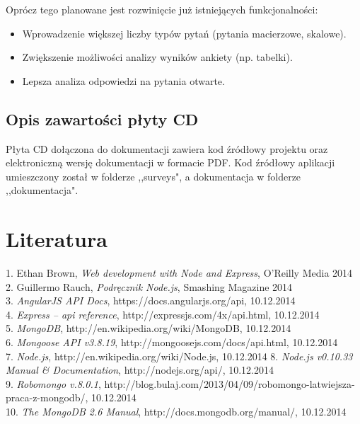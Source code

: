 \documentclass[12pt,a4paper,notitlepage]{article}
\begin{document}
Oprócz tego planowane jest rozwinięcie już istniejących funkcjonalności:
\begin{itemize}
\item Wprowadzenie większej liczby typów pytań (pytania macierzowe, skalowe).
\item Zwiększenie możliwości analizy wyników ankiety (np. tabelki).
\item Lepsza analiza odpowiedzi na pytania otwarte.
\end{itemize}

\subsection{Opis zawartości płyty CD}
Płyta CD dołączona do dokumentacji zawiera kod źródłowy projektu oraz elektroniczną wersję dokumentacji w formacie PDF. Kod źródłowy aplikacji umieszczony został w folderze ,,surveys", a dokumentacja w folderze ,,dokumentacja".

\newpage
\section*{Literatura}

%
1. Ethan Brown, \textit{Web development with Node and Express}, O’Reilly Media 2014 \\
2. Guillermo Rauch, \textit{Podręcznik Node.js}, Smashing Magazine 2014 \\
3. \textit{AngularJS API Docs}, https://docs.angularjs.org/api, 10.12.2014 \\
4. \textit{Express – api reference}, http://expressjs.com/4x/api.html, 10.12.2014 \\
5. \textit{MongoDB}, http://en.wikipedia.org/wiki/MongoDB, 10.12.2014 \\ 
6. \textit{Mongoose API v3.8.19}, http://mongoosejs.com/docs/api.html, 10.12.2014 \\
7. \textit{Node.js}, http://en.wikipedia.org/wiki/Node.js, 10.12.2014
8. \textit{Node.js v0.10.33 Manual \& Documentation}, http://nodejs.org/api/, 10.12.2014 \\
9. \textit{Robomongo v.8.0.1},
http://blog.bulaj.com/2013/04/09/robomongo-latwiejsza-praca-z-mongodb/, 10.12.2014 \\
10. \textit{The MongoDB 2.6 Manual}, http://docs.mongodb.org/manual/, 10.12.2014 \\






\newpage
\listoffigures
\newpage
\lstlistoflistings
\newpage
\end{document}
